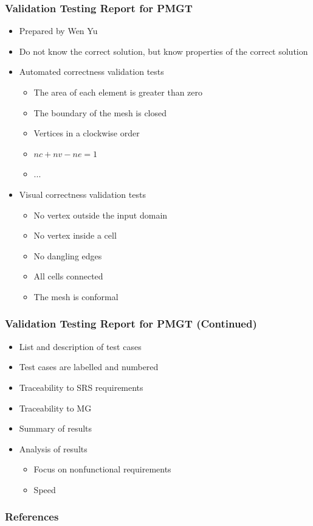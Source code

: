 \documentclass[t,12pt,numbers,fleqn]{beamer}
\begin{document}

\begin{frame}
\frametitle{Validation Testing Report for PMGT}
\begin{itemize}
\item Prepared by Wen Yu
\item Do not know the correct solution, but know properties of the correct solution
\item Automated correctness validation tests
\begin{itemize}
\item The area of each element is greater than zero
\item The boundary of the mesh is closed
\item Vertices in a clockwise order
\item $nc + nv - ne = 1$
\item ...
\end{itemize}
\item Visual correctness validation tests
\begin{itemize}
\item No vertex outside the input domain
\item No vertex inside a cell
\item No dangling edges
\item All cells connected
\item  The mesh is conformal
\end{itemize}
\end{itemize}
\end{frame}


\begin{frame}
\frametitle{Validation Testing Report for PMGT (Continued)}
\begin{itemize}
\item List and description of test cases
\item Test cases are labelled and numbered
\item Traceability to SRS requirements
\item Traceability to MG
\item Summary of results
\item Analysis of results
\begin{itemize}
\item Focus on nonfunctional requirements
\item Speed
\end{itemize}
\end{itemize}
\end{frame}


\begin{frame}[allowframebreaks]
\frametitle{References}



\end{frame}

\end{document}
